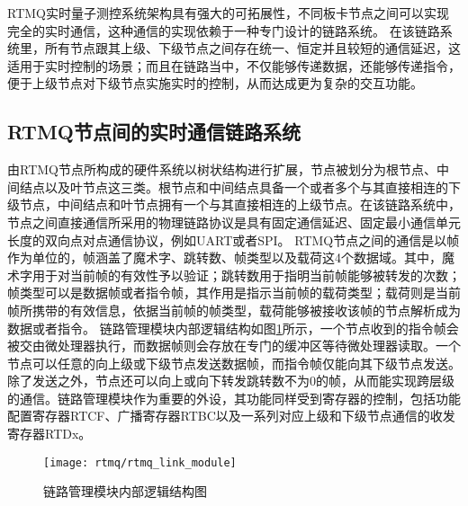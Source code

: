 RTMQ实时量子测控系统架构具有强大的可拓展性，不同板卡节点之间可以实现完全的实时通信，这种通信的实现依赖于一种专门设计的链路系统。
在该链路系统里，所有节点跟其上级、下级节点之间存在统一、恒定并且较短的通信延迟，这适用于实时控制的场景；而且在链路当中，不仅能够传递数据，还能够传递指令，便于上级节点对下级节点实施实时的控制，从而达成更为复杂的交互功能。

\subsection[RTMQ节点间的实时通信链路系统]{RTMQ节点间的实时通信链路系统}
由RTMQ节点所构成的硬件系统以树状结构进行扩展，节点被划分为根节点、中间结点以及叶节点这三类。根节点和中间结点具备一个或者多个与其直接相连的下级节点，中间结点和叶节点拥有一个与其直接相连的上级节点。在该链路系统中，节点之间直接通信所采用的物理链路协议是具有固定通信延迟、固定最小通信单元长度的双向点对点通信协议，例如UART或者SPI。
RTMQ节点之间的通信是以帧作为单位的，帧涵盖了魔术字、跳转数、帧类型以及载荷这4个数据域。其中，魔术字用于对当前帧的有效性予以验证；跳转数用于指明当前帧能够被转发的次数；帧类型可以是数据帧或者指令帧，其作用是指示当前帧的载荷类型；载荷则是当前帧所携带的有效信息，依据当前帧的帧类型，载荷能够被接收该帧的节点解析成为数据或者指令。
链路管理模块内部逻辑结构如图\ref{fig:rtmq_link_module}所示，一个节点收到的指令帧会被交由微处理器执行，而数据帧则会存放在专门的缓冲区等待微处理器读取。一个节点可以任意的向上级或下级节点发送数据帧，而指令帧仅能向其下级节点发送。除了发送之外，节点还可以向上或向下转发跳转数不为0的帧，从而能实现跨层级的通信。链路管理模块作为重要的外设，其功能同样受到寄存器的控制，包括功能配置寄存器RTCF、广播寄存器RTBC以及一系列对应上级和下级节点通信的收发寄存器RTDx。

\begin{figure}
    \centering
    \caption[链路管理模块内部逻辑结构图]{链路管理模块内部逻辑结构图\label{fig:rtmq_link_module}}
    \texttt{[image: rtmq/rtmq\_link\_module]}
\end{figure}

